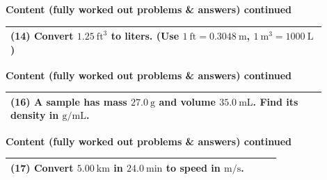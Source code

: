 \documentclass{article}
\begin{document}
\noindent
{\large \textbf{Content (fully worked out problems \& answers) continued}} \\[0.2em]
\begin{tabular}{|p{0.9\linewidth}|}
\hline
\vspace{0.2cm}

\textbf{(14)} Convert $1.25~\text{ft}^3$ to liters. (Use $1~\text{ft}=0.3048~\text{m}$, $1~\text{m}^3=1000~\text{L}$) \\
\hline
\end{tabular}
\newpage

\noindent
{\large \textbf{Content (fully worked out problems \& answers) continued}} \\[0.2em]
\begin{tabular}{|p{0.9\linewidth}|}
\hline
\vspace{0.2cm}

\textbf{(16)} A sample has mass $27.0~\text{g}$ and volume $35.0~\text{mL}$. Find its density in $\text{g/mL}$. \\
\hline
\end{tabular}
\newpage

\noindent
{\large \textbf{Content (fully worked out problems \& answers) continued}} \\[0.2em]
\begin{tabular}{|p{0.9\linewidth}|}
\hline
\vspace{0.2cm}

\textbf{(17)} Convert $5.00~\text{km}$ in $24.0~\text{min}$ to speed in $\text{m/s}$. \\
\hline
\end{tabular}
\newpage
\end{document}
